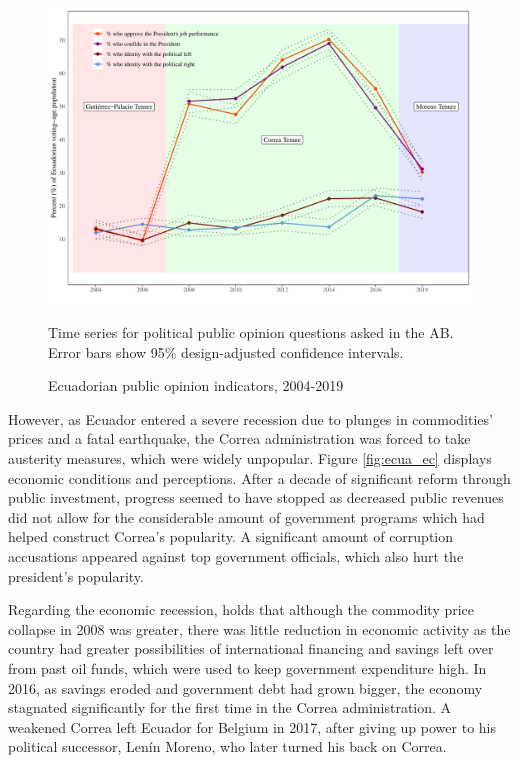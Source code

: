 \documentclass[12pt,a4]{article}
\makeatletter
\def\maxwidth{ %
  \ifdim\Gin@nat@width>\linewidth
    \linewidth
  \else
    \Gin@nat@width
  \fi
}
\newenvironment{knitrout}{}{} %
\makeatother
\begin{document}

\begin{figure}[htbp]
\centering
\begin{knitrout}
\color{fgcolor}

{\centering \includegraphics[width=\maxwidth]{figure/political_graph-1} 

}


\end{knitrout}
\caption{Ecuadorian public opinion indicators, 2004-2019}
\label{fig:ecua_pol}
Time series for political public opinion questions asked in the AB. Error bars show 95\% design-adjusted confidence intervals.
\end{figure}

However, as Ecuador entered a severe recession due to plunges in commodities’ prices and a fatal earthquake, the Correa administration was forced to take austerity measures, which were widely unpopular. Figure \ref{fig:ecua_ec} displays economic conditions and perceptions. After a decade of significant reform through public investment, progress seemed to have stopped as decreased public revenues did not allow for the considerable amount of government programs which had helped construct Correa's popularity. A significant amount of corruption accusations appeared against top government officials, which also hurt the president's popularity.

Regarding the economic recession, \textcite{Orozco.2015} holds that although the commodity price collapse in 2008 was greater, there was little reduction in economic activity as the country had greater possibilities of international financing and savings left over from past oil funds, which were used to keep government expenditure high. In 2016, as savings eroded and government debt had grown bigger, the economy stagnated significantly for the first time in the Correa administration. A weakened Correa left Ecuador for Belgium in 2017, after giving up power to his political successor, Lenín Moreno, who later turned his back on Correa.
\end{document}

